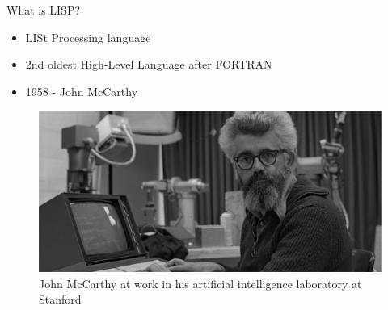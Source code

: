 \documentclass[ignorenonframetext,]{beamer}
\providecommand{\tightlist}{%
  \setlength{\itemsep}{0pt}\setlength{\parskip}{0pt}}
\begin{document}
\begin{frame}{What is LISP?}
\protect\hypertarget{what-is-lisp-1}{}

\begin{itemize}
\tightlist
\item
  LISt Processing language
\item
  2nd oldest High-Level Language after FORTRAN
\item
  1958 - John McCarthy
\end{itemize}

\begin{figure}
\centering
\includegraphics{john_mccarthy.jpg}
\caption{John McCarthy at work in his artificial intelligence laboratory
at Stanford}
\end{figure}

\end{frame}
\end{document}

